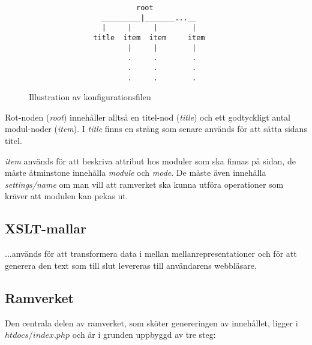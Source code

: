 \begin{figure}[h]
\begin{verbatim}
                         root
                 _________|_______...__
                 |     |     |        |
               title  item  item     item
                       |     |        |
                       .     .        .
                       .     .        .
                       .     .        .
\end{verbatim}
\caption{Illustration av konfigurationsfilen}
\label{fig:xml-config}
\end{figure}

Rot-noden ({\it root}) innehåller alltså en titel-nod ({\it title}) och ett
godtyckligt antal modul-noder ({\it item}). I {\it title} finns en sträng som
senare används för att sätta sidans titel.

{\it item} används för att beskriva attribut hos moduler som ska finnas på
sidan, de måste åtminstone innehålla {\it module} och {\it mode}. De måste även
innehålla {\it settings/name} om man vill att ramverket ska kunna utföra
operationer som kräver att modulen kan pekas ut.

\subsection{XSLT-mallar}


...används för att transformera data i mellan mellanrepresentationer och för att
generera den text som till slut levereras till användarens webbläsare.

\subsection{Ramverket}

Den centrala delen av ramverket, som sköter genereringen av innehållet, ligger
i $htdocs/index.php$ och är i grunden uppbyggd av tre steg:

